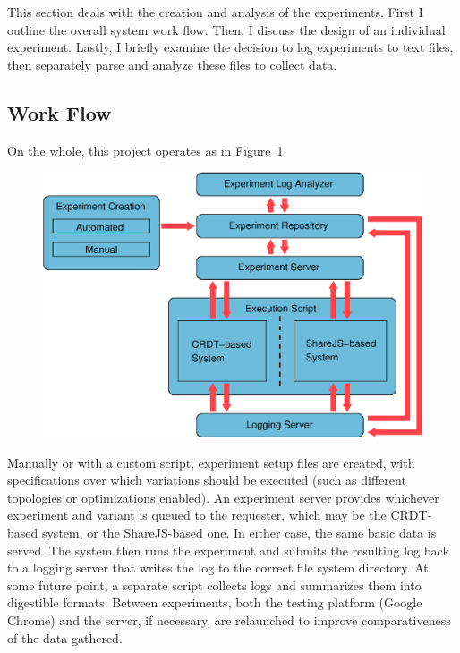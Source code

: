 \documentclass[12pt,a4paper,twoside,openright]{report}
\begin{document}
	This section deals with the creation and analysis of the experiments. First I outline the overall system work flow. Then, I discuss the design of an individual experiment. Lastly, I briefly examine the decision to log experiments to text files, then separately parse and analyze these files to collect data.

	\subsection{Work Flow}
	On the whole, this project operates as in Figure~\ref{fig:workflow}. 
	
	\begin{figure}[htb]
	\centering
	\includegraphics[width=1\linewidth]{figs/workflow.eps}
	\caption[Workflow]{}
	\label{fig:workflow}
	\end{figure}

	
	
	Manually or with a custom script, experiment setup files are created, with specifications over which variations should be executed (such as different topologies or optimizations enabled). An experiment server provides whichever experiment and variant is queued to the requester, which may be the CRDT-based system, or the ShareJS-based one. In either case, the same basic data is served. The system then runs the experiment and submits the resulting log back to a logging server that writes the log to the correct file system directory. At some future point, a separate script collects logs and summarizes them into digestible formats. Between experiments, both the testing platform (Google Chrome) and the server, if necessary, are relaunched to improve comparativeness of the data gathered.
\end{document}
